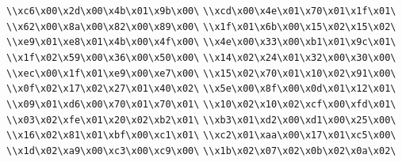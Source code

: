 \verb|\\xc6\x00\x2d\x00\x4b\x01\x9b\x00\|\newline
\verb|\\xcd\x00\x4e\x01\x70\x01\x1f\x01\|\newline
\verb|\\x62\x00\x8a\x00\x82\x00\x89\x00\|\newline
\verb|\\x1f\x01\x6b\x00\x15\x02\x15\x02\|\newline
\verb|\\xe9\x01\xe8\x01\x4b\x00\x4f\x00\|\newline
\verb|\\x4e\x00\x33\x00\xb1\x01\x9c\x01\|\newline
\verb|\\x1f\x02\x59\x00\x36\x00\x50\x00\|\newline
\verb|\\x14\x02\x24\x01\x32\x00\x30\x00\|\newline
\verb|\\xec\x00\x1f\x01\xe9\x00\xe7\x00\|\newline
\verb|\\x15\x02\x70\x01\x10\x02\x91\x00\|\newline
\verb|\\x0f\x02\x17\x02\x27\x01\x40\x02\|\newline
\verb|\\x5e\x00\x8f\x00\x0d\x01\x12\x01\|\newline
\verb|\\x09\x01\xd6\x00\x70\x01\x70\x01\|\newline
\verb|\\x10\x02\x10\x02\xcf\x00\xfd\x01\|\newline
\verb|\\x03\x02\xfe\x01\x20\x02\xb2\x01\|\newline
\verb|\\xb3\x01\xd2\x00\xd1\x00\x25\x00\|\newline
\verb|\\x16\x02\x81\x01\xbf\x00\xc1\x01\|\newline
\verb|\\xc2\x01\xaa\x00\x17\x01\xc5\x00\|\newline
\verb|\\x1d\x02\xa9\x00\xc3\x00\xc9\x00\|\newline
\verb|\\x1b\x02\x07\x02\x0b\x02\x0a\x02\|\newline
